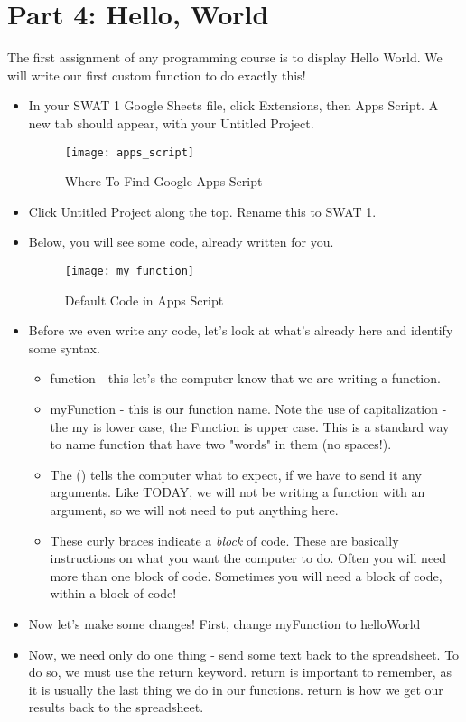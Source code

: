 \documentclass{article}
\begin{document}
\section*{Part 4:  Hello, World}
The first assignment of any programming course is to display Hello World.  We will write our first custom function to do exactly this!
\begin{itemize}
    \item In your SWAT 1 Google Sheets file, click Extensions, then Apps Script.  A new tab should appear, with your Untitled Project.
    \begin{figure}[H]
  \centering
  \texttt{[image: apps\_script]}
  \caption{Where To Find Google Apps Script}
\end{figure}
	\item Click Untitled Project along the top.  Rename this to SWAT 1.
	\item Below, you will see some code, already written for you. 
	\begin{figure}[H]
  \centering
  \texttt{[image: my\_function]}
  \caption{Default Code in Apps Script}
\end{figure} 
	\item Before we even write any code, let's look at what's already here and identify some syntax.
		\begin{itemize}
			\item function - this let's the computer know that we are writing a function.
			\item myFunction - this is our function name.  Note the use of capitalization - the my is lower case, the Function is upper case.  This is a standard way to name function that have two "words" in them (no spaces!).
			\item The () tells the computer what to expect, if we have to send it any arguments.  Like TODAY, we will not be writing a function with an argument, so we will not need to put anything here.
			\item { } These curly braces indicate a \textit{block} of code.  These are basically instructions on what you want the computer to do.  Often you will need more than one block of code.  Sometimes you will need a block of code, within a block of code!
		\end{itemize}
	\item Now let's make some changes!  First, change myFunction to helloWorld
	\item Now, we need only do one thing - send some text back to the spreadsheet.  To do so, we must use the return keyword.  return is important to remember, as it is usually the last thing we do in our functions.  return is how we get our results back to the spreadsheet.

\end{itemize}
\end{document}
